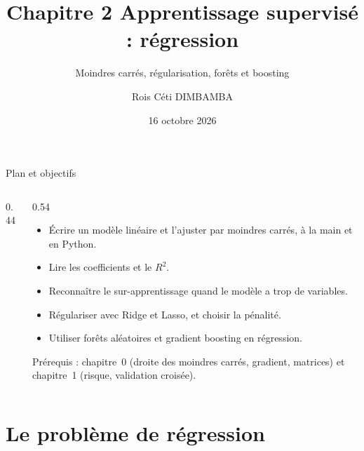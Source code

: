 \documentclass[aspectratio=169,11pt]{beamer}
\title{Chapitre 2 \textendash{} Apprentissage supervisé : régression}
\subtitle{Moindres carrés, régularisation, forêts et boosting}
\author{Rois Céti DIMBAMBA}
\institute{Ingénieur statisticien économiste \textperiodcentered{} Actuaire \textperiodcentered{} \href{https://rdimbamba.shinyapps.io/roisceti_e-cv/}{\textcolor{cnfVert}{CV en ligne}}}
\date{16 octobre 2026}
\begin{document}
\begin{frame}
  \titlepage
\end{frame}

\begin{frame}{Plan et objectifs}
  \begin{columns}[T]
    \begin{column}{0.44\textwidth}
      \footnotesize\tableofcontents
    \end{column}
    \begin{column}{0.54\textwidth}
      \begin{objectifs}
        \footnotesize
        \begin{itemize}
          \item Écrire un modèle linéaire et l'ajuster par moindres carrés, à la main et en Python.
          \item Lire les coefficients et le $R^2$.
          \item Reconnaître le sur-apprentissage quand le modèle a trop de variables.
          \item Régulariser avec Ridge et Lasso, et choisir la pénalité.
          \item Utiliser forêts aléatoires et gradient boosting en régression.
        \end{itemize}
      \end{objectifs}
      \vskip-1mm{\scriptsize\color{cnfGris}Prérequis : chapitre~0 (droite des moindres carrés, gradient, matrices) et chapitre~1 (risque, validation croisée).}
    \end{column}
  \end{columns}
\end{frame}

\section{Le problème de régression}
\end{document}
